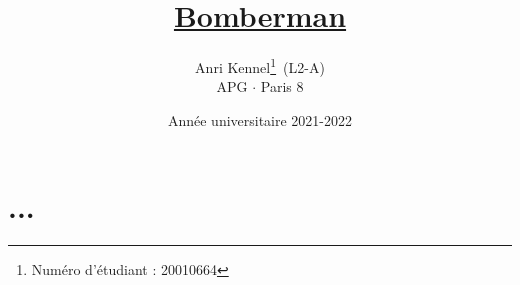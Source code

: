 \documentclass{article}
\title{\href{https://code.up8.edu/Anri/bomberman}{Bomberman}}
\author{Anri Kennel\thanks{Numéro d'étudiant : 20010664}\, (L2-A)\\APG $\cdot$ Paris 8}
\date{Année universitaire 2021-2022}
\begin{document}
    \maketitle
    \tableofcontents
    \clearpage

    \section{...}
\end{document}
